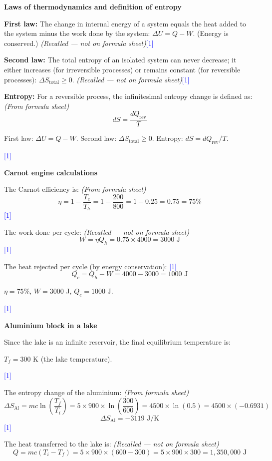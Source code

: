 \documentclass[12pt,a4paper]{article}
\newcommand{\markstep}[1]{\hfill\textcolor{blue}{[#1]}}
\newcommand{\finalanswer}[1]{%
  \begin{tcolorbox}[colback=green!5!white,colframe=green!50!black,boxrule=0.5pt]
  #1
  \end{tcolorbox}
}
\newcommand{\fromsheet}{\textit{(From formula sheet)}}
\newcommand{\recalled}{\textit{(Recalled --- not on formula sheet)}}
\begin{document}
\begin{parts}

\item \textbf{Laws of thermodynamics and definition of entropy} 

\textbf{First law:} The change in internal energy of a system equals the heat added to the system minus the work done by the system: $\Delta U = Q - W$. (Energy is conserved.) \recalled \markstep{1}

\textbf{Second law:} The total entropy of an isolated system can never decrease; it either increases (for irreversible processes) or remains constant (for reversible processes): $\Delta S_{\text{total}} \geq 0$. \recalled \markstep{1}

\textbf{Entropy:} For a reversible process, the infinitesimal entropy change is defined as: \fromsheet
\[
dS = \frac{dQ_{\text{rev}}}{T}
\]

\finalanswer{First law: $\Delta U = Q - W$. Second law: $\Delta S_{\text{total}} \geq 0$. Entropy: $dS = dQ_{\text{rev}}/T$.}
\markstep{1}

\item \textbf{Carnot engine calculations} 

The Carnot efficiency is: \fromsheet
\[
\eta = 1 - \frac{T_c}{T_h} = 1 - \frac{200}{800} = 1 - 0.25 = 0.75 = 75\%
\]
\markstep{1}

The work done per cycle: \recalled
\[
W = \eta Q_h = 0.75\times 4000 = 3000\text{ J}
\]
\markstep{1}

The heat rejected per cycle (by energy conservation): \markstep{1}
\[
Q_c = Q_h - W = 4000 - 3000 = 1000\text{ J}
\]

\finalanswer{$\eta = 75\%$, \quad $W = 3000$ J, \quad $Q_c = 1000$ J.}
\markstep{1}

\item \textbf{Aluminium block in a lake} 

Since the lake is an infinite reservoir, the final equilibrium temperature is:

\finalanswer{$T_f = 300$ K (the lake temperature).}
\markstep{1}

The entropy change of the aluminium: \fromsheet
\[
\Delta S_{\text{Al}} = mc\ln\!\left(\frac{T_f}{T_i}\right) = 5\times 900\times\ln\!\left(\frac{300}{600}\right) = 4500\times\ln(0.5) = 4500\times(-0.6931)
\]
\[
\Delta S_{\text{Al}} = -3119\text{ J/K}
\]
\markstep{1}

The heat transferred to the lake is: \recalled
\[
Q = mc(T_i - T_f) = 5\times 900\times(600 - 300) = 5\times 900\times 300 = 1{,}350{,}000\text{ J}
\]


\end{parts}
\end{document}
